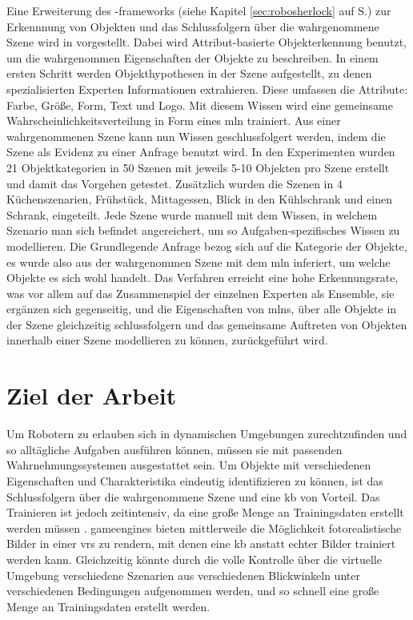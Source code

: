 Eine Erweiterung des \robosherlock-\glspl{framework} (siehe Kapitel \ref{sec:robosherlock} auf S.\pageref{sec:robosherlock}) zur Erkennnung von Objekten und das Schlussfolgern über die wahrgenommene Szene wird in \cite{pr2looking} vorgestellt. Dabei wird Attribut-basierte Objekterkennung benutzt, um die wahrgenommen Eigenschaften der Objekte zu beschreiben. In einem ersten Schritt werden Objekthypothesen in der Szene aufgestellt, zu denen spezialisierten Experten Informationen extrahieren. Diese umfassen die Attribute: Farbe, Größe, Form, Text und Logo. Mit diesem Wissen wird eine gemeinsame Wahrscheinlichkeitsverteilung in Form eines \gls{mln} trainiert. Aus einer wahrgenommenen Szene kann nun Wissen geschlussfolgert werden, indem die Szene als Evidenz zu einer Anfrage benutzt wird. In den Experimenten wurden 21 Objektkategorien in 50 Szenen mit jeweils 5-10 Objekten pro Szene erstellt und damit das Vorgehen getestet. Zusätzlich wurden die Szenen in 4 Küchenszenarien, Frühstück, Mittagessen, Blick in den Kühlschrank und einen Schrank, eingeteilt. Jede Szene wurde manuell mit dem Wissen, in welchem Szenario man sich befindet angereichert, um so Aufgaben-spezifisches Wissen zu modellieren. Die Grundlegende Anfrage bezog sich auf die Kategorie der Objekte, es wurde also aus der wahrgenommen Szene mit dem \gls{mln} inferiert, um welche Objekte es sich wohl handelt. Das Verfahren erreicht eine hohe Erkennungsrate, was vor allem auf das Zusammenspiel der einzelnen Experten als Ensemble, sie ergänzen sich gegenseitig, und die Eigenschaften von \glspl{mln}, über alle Objekte in der Szene gleichzeitig schlussfolgern und das gemeinsame Auftreten von Objekten innerhalb einer Szene modellieren zu können, zurückgeführt wird.

\section{Ziel der Arbeit}
\label{sec:goal}

Um Robotern zu erlauben sich in dynamischen Umgebungen zurechtzufinden und so alltägliche Aufgaben ausführen können, müssen sie mit passenden Wahrnehmungssystemen ausgestattet sein. Um Objekte mit verschiedenen Eigenschaften und Charakteristika eindeutig identifizieren zu können, ist das Schlussfolgern über die wahrgenommene Szene und eine \gls{kb} von Vorteil. Das Trainieren ist jedoch zeitintensiv, da eine große Menge an Trainingsdaten erstellt werden müssen \cite{burger1995}. \glspl{gameengine} bieten mittlerweile die Möglichkeit fotorealistische Bilder in einer \glspl{vr} zu rendern, mit denen eine \gls{kb} anstatt echter Bilder trainiert werden kann. Gleichzeitig könnte durch die volle Kontrolle über die virtuelle Umgebung verschiedene Szenarien aus verschiedenen Blickwinkeln unter verschiedenen Bedingungen aufgenommen werden, und so schnell eine große Menge an Trainingsdaten erstellt werden. \par 

